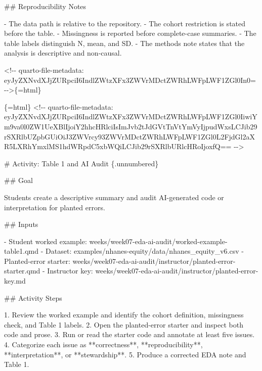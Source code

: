 \documentclass[
  letterpaper,
  DIV=11,
  numbers=noendperiod,
  oneside]{scrreprt}
\newenvironment{Shaded}{\begin{snugshade}}{\end{snugshade}}
\newcommand{\FunctionTok}[1]{\textcolor[rgb]{0.28,0.35,0.67}{#1}}
\newcommand{\InformationTok}[1]{\textcolor[rgb]{0.37,0.37,0.37}{#1}}
\newcommand{\NormalTok}[1]{\textcolor[rgb]{0.00,0.23,0.31}{#1}}
\newcommand{\SpecialStringTok}[1]{\textcolor[rgb]{0.13,0.47,0.30}{#1}}
\begin{document}
\begin{Shaded}
\begin{Highlighting}[numbers=left,,]
\FunctionTok{\#\# Reproducibility Notes}

\SpecialStringTok{{-} }\NormalTok{The data path is relative to the repository.}
\SpecialStringTok{{-} }\NormalTok{The cohort restriction is stated before the table.}
\SpecialStringTok{{-} }\NormalTok{Missingness is reported before complete{-}case summaries.}
\SpecialStringTok{{-} }\NormalTok{The table labels distinguish N, mean, and SD.}
\SpecialStringTok{{-} }\NormalTok{The methods note states that the analysis is descriptive and non{-}causal.}


\InformationTok{\textasciigrave{}\textless{}!{-}{-} quarto{-}file{-}metadata: eyJyZXNvdXJjZURpciI6IndlZWtzXFx3ZWVrMDctZWRhLWFpLWF1ZGl0In0= {-}{-}\textgreater{}\textasciigrave{}}\NormalTok{\{=html\}}

\InformationTok{\textasciigrave{}\textasciigrave{}\textasciigrave{}\{=html\}}
\InformationTok{\textless{}!{-}{-} quarto{-}file{-}metadata: eyJyZXNvdXJjZURpciI6IndlZWtzXFx3ZWVrMDctZWRhLWFpLWF1ZGl0IiwiYm9va0l0ZW1UeXBlIjoiY2hhcHRlciIsImJvb2tJdGVtTnVtYmVyIjpudWxsLCJib29rSXRlbUZpbGUiOiJ3ZWVrcy93ZWVrMDctZWRhLWFpLWF1ZGl0L2FjdGl2aXR5LXRhYmxlMS1hdWRpdC5xbWQiLCJib29rSXRlbURlcHRoIjoxfQ== {-}{-}\textgreater{}}
\InformationTok{\textasciigrave{}\textasciigrave{}\textasciigrave{}}

\FunctionTok{\# Activity: Table 1 and AI Audit \{.unnumbered\}}


\FunctionTok{\#\# Goal}

\NormalTok{Students create a descriptive summary and audit AI{-}generated code or interpretation for planted errors.}

\FunctionTok{\#\# Inputs}

\SpecialStringTok{{-} }\NormalTok{Student worked example: }\InformationTok{\textasciigrave{}weeks/week07{-}eda{-}ai{-}audit/worked{-}example{-}table1.qmd\textasciigrave{}}
\SpecialStringTok{{-} }\NormalTok{Dataset: }\InformationTok{\textasciigrave{}examples/nhanes{-}equity/data/nhanes\_equity\_v6.csv\textasciigrave{}}
\SpecialStringTok{{-} }\NormalTok{Planted{-}error starter: }\InformationTok{\textasciigrave{}weeks/week07{-}eda{-}ai{-}audit/instructor/planted{-}error{-}starter.qmd\textasciigrave{}}
\SpecialStringTok{{-} }\NormalTok{Instructor key: }\InformationTok{\textasciigrave{}weeks/week07{-}eda{-}ai{-}audit/instructor/planted{-}error{-}key.md\textasciigrave{}}

\FunctionTok{\#\# Activity Steps}

\SpecialStringTok{1. }\NormalTok{Review the worked example and identify the cohort definition, missingness check, and Table 1 labels.}
\SpecialStringTok{2. }\NormalTok{Open the planted{-}error starter and inspect both code and prose.}
\SpecialStringTok{3. }\NormalTok{Run or read the starter code and annotate at least five issues.}
\SpecialStringTok{4. }\NormalTok{Categorize each issue as **correctness**, **reproducibility**, **interpretation**, or **stewardship**.}
\SpecialStringTok{5. }\NormalTok{Produce a corrected EDA note and Table 1.}


\end{Highlighting}
\end{Shaded}
\end{document}

